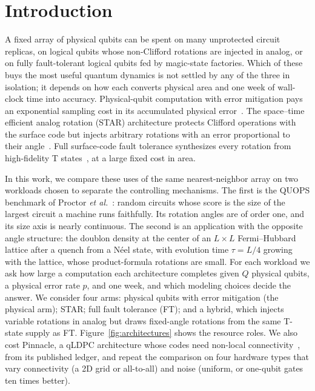 \documentclass[11pt]{article}
\begin{document}
\section{Introduction}\label{sec:intro}
A fixed array of physical qubits can be spent on many unprotected circuit
replicas, on logical qubits whose non-Clifford rotations are injected in
analog, or on fully fault-tolerant logical qubits fed by magic-state
factories. Which of these buys the most useful quantum dynamics is not
settled by any of the three in isolation; it depends on how each converts
physical area and one week of wall-clock time into accuracy. Physical-qubit
computation with error mitigation pays an exponential sampling cost in its
accumulated physical error~\cite{temme}. The space--time efficient analog
rotation (STAR) architecture protects Clifford operations with the surface
code but injects arbitrary rotations with an error proportional to their
angle~\cite{akahoshi,toshio}. Full surface-code fault tolerance synthesizes
every rotation from high-fidelity T states~\cite{ross,litinski,gidney2024cultivation},
at a large fixed cost in area.

In this work, we compare these uses of the same nearest-neighbor array on two
workloads chosen to separate the controlling mechanisms. The first is the QUOPS
benchmark of Proctor \textit{et al.}~\cite{proctor2026quops}: random circuits
whose score is the size of the largest circuit a machine runs faithfully. Its
rotation angles are of order one, and its size axis is nearly continuous. The
second is an application with the opposite angle structure: the doublon density
at the center of an $L\times L$ Fermi--Hubbard lattice after a quench from a
N\'eel state, with evolution time $\tau=L/4$ growing with the lattice, whose
product-formula rotations are small. For each workload we ask how large a
computation each architecture completes given $Q$ physical qubits, a physical
error rate $p$, and one week, and which modeling choices decide the answer. We
consider four arms: physical qubits with error mitigation (the physical arm); STAR; full
fault tolerance (FT); and a hybrid, which injects variable rotations in analog
but draws fixed-angle rotations from the same T-state supply as FT.
Figure~\ref{fig:architectures} shows the resource roles. We also cost
Pinnacle, a qLDPC architecture whose codes need non-local
connectivity~\cite{webster2026pinnacle}, from its published ledger, and repeat
the comparison on four hardware types that vary connectivity (a 2D grid or
all-to-all) and noise (uniform, or one-qubit gates ten times better).
\end{document}
